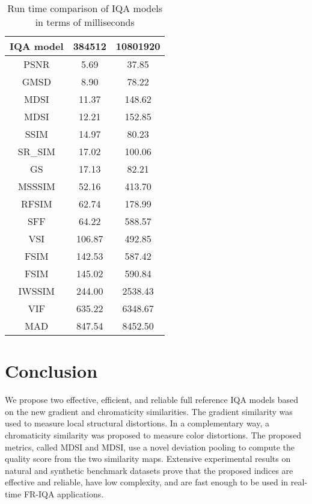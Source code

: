 \begin{table}[htb]
\centering
\caption{Run time comparison of IQA models in terms of milliseconds}
\begin{tabular}{ccc}
\hline
IQA model                    & 384512 & 10801920 \\ \hline
{PSNR}    & 5.69 & 37.85                       \\
{GMSD} \cite{GMSD}    & 8.90 & 78.22                      \\
 {MDSI}    & 11.37 & 148.62                      \\
 {MDSI}    & 12.21 & 152.85                       \\
{SSIM} \cite{SSIM}    & 14.97 & 80.23                       \\
{SR\_SIM} \cite{SRSIM} & 17.02 & 100.06                       \\
{GS} \cite{GS}      & 17.13 & 82.21                       \\
{MSSSIM} \cite{MSSSIM}  & 52.16 & 413.70                       \\
{RFSIM} \cite{RFSIM}   & 62.74 & 178.99                       \\
{SFF} \cite{SFF}    & 64.22 & 588.57                       \\
{VSI} \cite{VSI}    & 106.87 & 492.85                      \\
{FSIM} \cite{FSIM}   & 142.53 & 587.42                     \\
{FSIM} \cite{FSIM}   & 145.02 & 590.84                     \\
{IWSSIM} \cite{IWSSIM} & 244.00 & 2538.43                      \\
{VIF} \cite{VIF}    & 635.22 & 6348.67                      \\
{MAD} \cite{MAD}    & 847.54 & 8452.50                     \\
\hline   
\end{tabular}
\label{time}
\end{table}



\afterpage{\clearpage}


\section{Conclusion}
\label{conclusion}

We propose two effective, efficient, and reliable full reference IQA models based on the new gradient and chromaticity similarities. The gradient similarity was used to measure local structural distortions. In a complementary way, a chromaticity similarity was proposed to measure color distortions. The proposed metrics, called MDSI and MDSI, use a novel deviation pooling to compute the quality score from the two similarity maps. Extensive experimental results on natural and synthetic benchmark datasets prove that the proposed indices are effective and reliable, have low complexity, and are fast enough to be used in real-time FR-IQA applications.  






